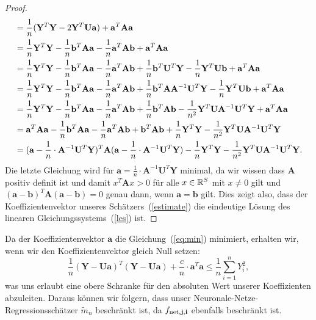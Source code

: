 \begin{proof}
\begin{equation*}
\begin{split}
& = \frac{1}{n}(\mathbf{Y}^T\mathbf{Y} - 2\mathbf{Y}^T\mathbf{U}\mathbf{a}) + \mathbf{a}^T \mathbf{A} \mathbf{a} \\
& = \frac{1}{n}\mathbf{Y}^T\mathbf{Y} - \frac{1}{n}\mathbf{b}^T\mathbf{A}\mathbf{a} - \frac{1}{n}\mathbf{a}^T\mathbf{A}\mathbf{b} + \mathbf{a}^T\mathbf{A}\mathbf{a} \\
& = \frac{1}{n}\mathbf{Y}^T\mathbf{Y} - \frac{1}{n}\mathbf{b}^T\mathbf{A}\mathbf{a} - \frac{1}{n}\mathbf{a}^T\mathbf{A}\mathbf{b} + \frac{1}{n}\mathbf{b}^T\mathbf{U}^T\mathbf{Y} - \frac{1}{n}\mathbf{Y}^T\mathbf{U}\mathbf{b} + \mathbf{a}^T\mathbf{A}\mathbf{a} \\
& = \frac{1}{n}\mathbf{Y}^T\mathbf{Y} - \frac{1}{n}\mathbf{b}^T\mathbf{A}\mathbf{a} - \frac{1}{n}\mathbf{a}^T\mathbf{A}\mathbf{b} + \frac{1}{n}\mathbf{b}^T\mathbf{A}\mathbf{A}^{-1}\mathbf{U}^T\mathbf{Y} - \frac{1}{n}\mathbf{Y}^T\mathbf{U}\mathbf{b} + \mathbf{a}^T\mathbf{A}\mathbf{a} \\
& = \frac{1}{n}\mathbf{Y}^T\mathbf{Y} - \frac{1}{n}\mathbf{b}^T\mathbf{A}\mathbf{a} - \frac{1}{n}\mathbf{a}^T\mathbf{A}\mathbf{b} + \frac{1}{n}\mathbf{b}^T\mathbf{A}\mathbf{b} - \frac{1}{n^2}\mathbf{Y}^T\mathbf{U}\mathbf{A}^{-1}\mathbf{U}^T\mathbf{Y} + \mathbf{a}^T\mathbf{A}\mathbf{a} \\
& = \mathbf{a}^T\mathbf{A}\mathbf{a} - \frac{1}{n}\mathbf{b}^T\mathbf{A}\mathbf{a} - \frac{1}{n}\mathbf{a}^T\mathbf{A}\mathbf{b} + \mathbf{b}^T\mathbf{A}\mathbf{b} + \frac{1}{n}\mathbf{Y}^T\mathbf{Y} - \frac{1}{n^2}\mathbf{Y}^T\mathbf{U}\mathbf{A}^{-1}\mathbf{U}^T\mathbf{Y} \\
& = (\mathbf{a} - \frac{1}{n} \cdot \mathbf{A}^{-1}\mathbf{U}^T\mathbf{Y})^T \mathbf{A} (\mathbf{a} - \frac{1}{n} \cdot \mathbf{A}^{-1} \mathbf{U}^T\mathbf{Y}) - \frac{1}{n}\mathbf{Y}^T\mathbf{Y} - \frac{1}{n^2}\mathbf{Y}^T\mathbf{U}\mathbf{A}^{-1}\mathbf{U}^T\mathbf{Y}.
\end{split} 
\end{equation*} 
Die letzte Gleichung wird für $\mathbf{a} = \frac{1}{n} \cdot \mathbf{A}^{-1}\mathbf{U}^T\mathbf{Y}$ minimal, 
da wir wissen dass $\mathbf{A}$ positiv definit ist und damit $x^T\mathbf{A}x > 0$ für alle $x \in \mathbb{R}^S$ mit $x \neq 0$ gilt und $(\mathbf{a} - \mathbf{b})^T\mathbf{A}(\mathbf{a} - \mathbf{b}) = 0$ genau dann, wenn $\mathbf{a} = \mathbf{b}$ gilt.
Dies zeigt also, dass der Koeffizientenvektor unseres Schätzers~(\ref{estimate}) die eindeutige Lösung des linearen Gleichungssystems~(\ref{les}) ist.
\end{proof}
\begin{bemnumber}
\label{mtildebeschraenkt}
Da der Koeffizientenvektor $\mathbf{a}$ die Gleichung~(\ref{eq:min}) minimiert, erhalten wir, wenn wir den Koeffizientenvektor gleich Null setzen:
$$\frac{1}{n}(\mathbf{Y} - \mathbf{U}\mathbf{a})^T(\mathbf{Y} - \mathbf{U}\mathbf{a}) + \frac{c}{n} \cdot \mathbf{a}^T\mathbf{a} \leq \frac{1}{n} \sum_{i = 1}^n Y_i^2,$$
was uns erlaubt eine obere Schranke für den absoluten Wert unserer Koeffizienten abzuleiten. Daraus können wir folgern, dass unser Neuronale-Netze-Regressionsschätzer $\tilde{m}_n$ beschränkt ist, da $f_{\mathrm{net},\mathbf{j},\mathbf{i}}$ ebenfalls beschränkt ist.
\end{bemnumber}